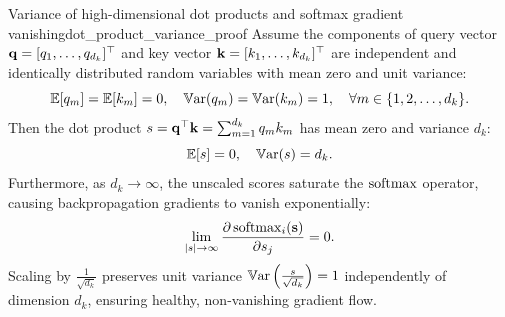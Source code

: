 \documentclass[../../main.tex]{subfiles}
\begin{document}
\begin{theorem}{Variance of high-dimensional dot products and softmax gradient vanishing}{dot_product_variance_proof}
Assume the components of query vector $\mathbf{q} = [q_1, \dots, q_{d_k}]^\top$ and key vector $\mathbf{k} = [k_1, \dots, k_{d_k}]^\top$ are independent and identically distributed random variables with mean zero and unit variance:
\begin{equation}
\label{eq:qk_statistical_assumptions}
\operatorname*{\mathbb{E}}[q_m] = \operatorname*{\mathbb{E}}[k_m] = 0, \quad \operatorname{\mathbb{V}\mathrm{ar}}(q_m) = \operatorname{\mathbb{V}\mathrm{ar}}(k_m) = 1, \quad \forall m \in \{1, 2, \dots, d_k\}.
\end{equation}
Then the dot product $s = \mathbf{q}^\top \mathbf{k} = \sum_{m=1}^{d_k} q_m k_m$ has mean zero and variance $d_k$:
\begin{equation}
\label{eq:unscaled_variance_result}
\operatorname*{\mathbb{E}}[s] = 0, \quad \operatorname{\mathbb{V}\mathrm{ar}}(s) = d_k.
\end{equation}
Furthermore, as $d_k \to \infty$, the unscaled scores saturate the $\operatorname{\mathrm{softmax}}$ operator, causing backpropagation gradients to vanish exponentially:
\begin{equation}
\label{eq:gradient_vanish_limit}
\lim_{|s| \to \infty} \frac{\partial \operatorname{\mathrm{softmax}}_i(\mathbf{s})}{\partial s_j} = 0.
\end{equation}
Scaling by $\frac{1}{\sqrt{d_k}}$ preserves unit variance $\operatorname{\mathbb{V}\mathrm{ar}}\left(\frac{s}{\sqrt{d_k}}\right) = 1$ independently of dimension $d_k$, ensuring healthy, non-vanishing gradient flow.
\end{theorem}
\end{document}
